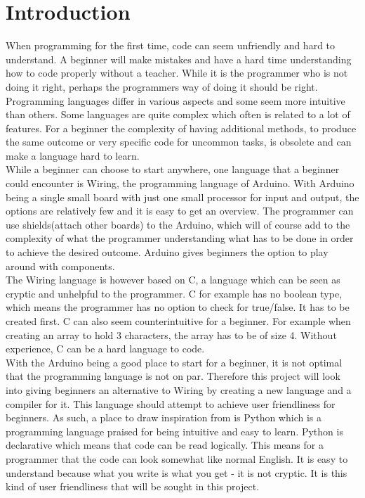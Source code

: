 \section{Introduction}
When programming for the first time, code can seem unfriendly and hard to understand. A beginner will make mistakes and have a hard time understanding how to code properly without a teacher. While it is the programmer who is not doing it right, perhaps the programmers way of doing it should be right. \\

Programming languages differ in various aspects and some seem more intuitive than others. Some languages are quite complex which often is related to a lot of features. For a beginner the complexity of having additional methods, to produce the same outcome or very specific code for uncommon tasks, is obsolete and can make a language hard to learn. \\

While a beginner can choose to start anywhere, one language that a beginner could encounter is Wiring, the programming language of Arduino. With Arduino being a single small board with just one small processor for input and output, the options are relatively few and it is easy to get an overview. The programmer can use shields(attach other boards) to the Arduino, which will of course add to the complexity of what the programmer understanding what has to be done in order to achieve the desired outcome. Arduino gives beginners the option to play around with components.\\

The Wiring language is however based on C, a language which can be seen as cryptic and unhelpful to the programmer. C for example has no boolean type, which means the programmer has no option to check for true/false. It has to be created first. C can also seem counterintuitive for a beginner. For example when creating an array to hold 3 characters, the array has to be of size 4.  Without experience, C can be a hard language to code. \\

With the Arduino being a good place to start for a beginner, it is not optimal that the programming language is not on par. Therefore this project will look into giving beginners an alternative to Wiring by creating a new language and a compiler for it. This language should attempt to achieve user friendliness for beginners. As such, a place to draw inspiration from is Python which is a programming language praised for being intuitive and easy to learn. Python is declarative which means that code can be read logically. This means for a programmer that the code can look somewhat like normal English. It is easy to understand because what you write is what you get - it is not cryptic. It is this kind of user friendliness that will be sought in this project.
